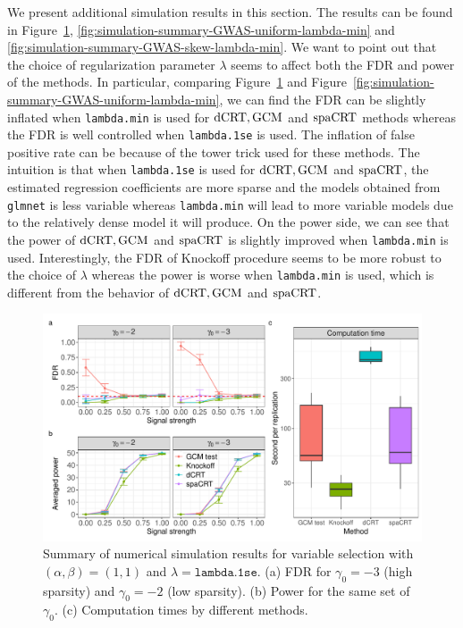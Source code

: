 \documentclass[12pt]{article}
\theoremstyle{definition}
\newcommand{\dCRT}{\textnormal{dCRT}} 					%
\newcommand{\GCM}{\textnormal{GCM}}						%
\newcommand{\spacrt}{\textnormal{spaCRT}}               %
\begin{document}
We present additional simulation results in this section.  The results can be found in Figure~\ref{fig:simulation-summary-GWAS-uniform-lambda-1se}, \ref{fig:simulation-summary-GWAS-uniform-lambda-min} and \ref{fig:simulation-summary-GWAS-skew-lambda-min}. We want to point out that the choice of regularization parameter $\lambda$ seems to affect both the FDR and power of the methods. In particular, comparing Figure~\ref{fig:simulation-summary-GWAS-uniform-lambda-1se} and Figure~\ref{fig:simulation-summary-GWAS-uniform-lambda-min}, we can find the FDR can be slightly inflated when \texttt{lambda.min} is used for $\dCRT,\GCM$ and $\spacrt$ methods whereas the FDR is well controlled when \texttt{lambda.1se} is used. The inflation of false positive rate can be because of the tower trick used for these methods. The intuition is that when \texttt{lambda.1se} is used for $\dCRT,\GCM$ and $\spacrt$, the estimated regression coefficients are more sparse and the models obtained from \texttt{glmnet} is less variable whereas \texttt{lambda.min} will lead to more variable models due to the relatively dense model it will produce. On the power side, we can see that the power of $\dCRT,\GCM$ and $\spacrt$ is slightly improved when \texttt{lambda.min} is used. Interestingly, the FDR of Knockoff procedure seems to be more robust to the choice of $\lambda$ whereas the power is worse when \texttt{lambda.min} is used, which is different from the behavior of $\dCRT,\GCM$ and $\spacrt$. 

\begin{figure}[!ht]
  \centering
  \includegraphics[width=1.0\textwidth]{figures-and-tables/simulation/HMM-variable-selection/HMM_simulation_uniform_lambda.1se.pdf}
  \caption{Summary of numerical simulation results for variable selection  with $(\alpha,\beta)=(1,1)$ and $\lambda=\texttt{lambda.1se}$. (a) FDR for $\gamma_0=-3$ (high sparsity) and $\gamma_0=-2$ (low sparsity). (b) Power for the same set of $\gamma_0$. (c) Computation times by different methods. }
  \label{fig:simulation-summary-GWAS-uniform-lambda-1se}
\end{figure}
\end{document}
